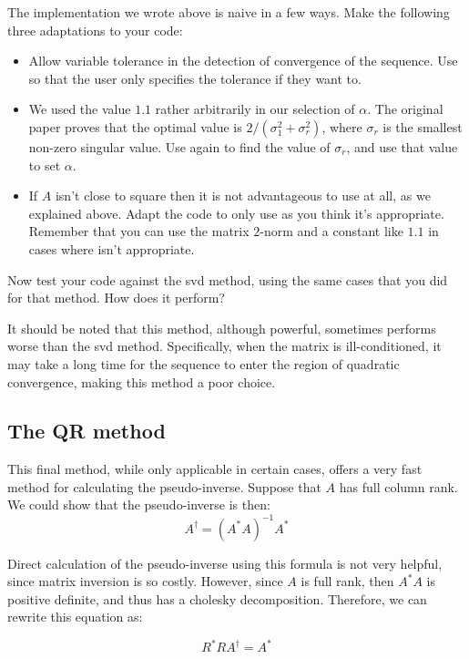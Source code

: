 \begin{problem}
The implementation we wrote above is naive in a few ways. Make the following three adaptations to your code:
\begin{itemize}
\item Allow variable tolerance in the detection of convergence of the sequence. Use  so that the user only specifies the tolerance if they want to.
\item We used the value $1.1$ rather arbitrarily in our selection of $\alpha$. The original paper proves that the optimal value is $2/(\sigma_1^2 + \sigma_r^2)$, where $\sigma_r$ is the smallest non-zero singular value. Use  again to find the value of $\sigma_r$, and use that value to set $\alpha$.
\item If $A$ isn't close to square then it is not advantageous to use  at all, as we explained above. Adapt the code to only use  as you think it's appropriate. Remember that you can use the matrix $2$-norm and a constant like $1.1$ in cases where  isn't appropriate.
\end{itemize}

Now test your code against the svd method, using the same cases that you did for that method. How does it perform?
\end{problem}

It should be noted that this method, although powerful, sometimes performs worse than the svd method. Specifically, when the matrix is ill-conditioned, it may take a long time for the sequence to enter the region of quadratic convergence, making this method a poor choice.

\subsection*{The QR method}

This final method, while only applicable in certain cases, offers a very fast method for calculating the pseudo-inverse. Suppose that $A$ has full column rank. We could show that the pseudo-inverse is then:
\[
A^\dagger = (A^* A)^{-1} A^*
\]

Direct calculation of the pseudo-inverse using this formula is not very helpful, since matrix inversion is so costly. However, since $A$ is full rank, then $A^*A$ is positive definite, and thus has a cholesky decomposition. Therefore, we can rewrite this equation as:

\[
R^*R A^\dagger = A^*
\]

